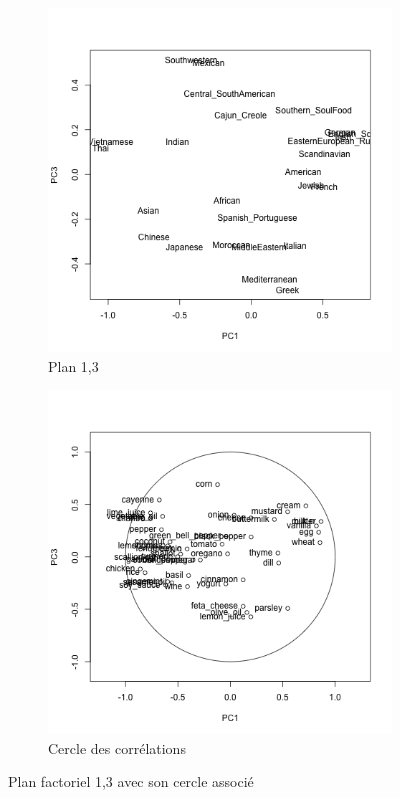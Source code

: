 \documentclass[a4paper,11pt,oneside,roman]{article}
\begin{document}
    \begin{figure}
        \centering
        \begin{subfigure}{.5\textwidth}
          \centering
          \includegraphics[width=.8\linewidth]{imgs/acp_plan_1_3.png}
          \caption{Plan 1,3}
          \label{fig:sub1}
        \end{subfigure}%
        \begin{subfigure}{.5\textwidth}
          \centering
          \includegraphics[width=.8\linewidth]{imgs/cercle_plan_1_3.png}
          \caption{Cercle des corrélations}
          \label{fig:sub2}
        \end{subfigure}
        \caption{Plan factoriel 1,3 avec son cercle associé}
        \label{fig_acp_plan_1_2}
    \end{figure}
\end{document}
